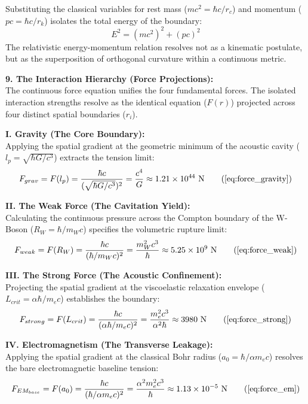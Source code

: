 Substituting the classical variables for rest mass ($mc^2 = \hbar c / r_c$) and momentum ($pc = \hbar c / r_k$) isolates the total energy of the boundary:
\begin{equation}
    E^2 = (mc^2)^2 + (pc)^2 
\end{equation}
The relativistic energy-momentum relation resolves not as a kinematic postulate, but as the superposition of orthogonal curvature within a continuous metric.

\vspace{0.2 cm}

\textbf{9. The Interaction Hierarchy (Force Projections):} \\
The continuous force equation unifies the four fundamental forces. The isolated interaction strengths resolve as the identical equation ($F(r)$) projected across four distinct spatial boundaries ($r_i$).

\textbf{I. Gravity (The Core Boundary):} \\
Applying the spatial gradient at the geometric minimum of the acoustic cavity ($l_p = \sqrt{\hbar G / c^3}$) extracts the tension limit:
\begin{equation}
    F_{grav} = F(l_p) = \frac{\hbar c}{(\sqrt{\hbar G / c^3})^2} = \frac{c^4}{G} \approx 1.21 \times 10^{44} \text{ N} \tag{\ref{eq:force_gravity}} 
\end{equation}

\textbf{II. The Weak Force (The Cavitation Yield):} \\
Calculating the continuous pressure across the Compton boundary of the W-Boson ($R_W = \hbar / m_W c$) specifies the volumetric rupture limit: 
\begin{equation}
    F_{weak} = F(R_W) = \frac{\hbar c}{(\hbar / m_W c)^2} = \frac{m_W^2 c^3}{\hbar} \approx 5.25 \times 10^9 \text{ N} \tag{\ref{eq:force_weak}} 
\end{equation}

\textbf{III. The Strong Force (The Acoustic Confinement):} \\
Projecting the spatial gradient at the viscoelastic relaxation envelope ($L_{crit} = \alpha \hbar / m_e c$) establishes the boundary: 
\begin{equation}
    F_{strong} = F(L_{crit}) = \frac{\hbar c}{(\alpha \hbar / m_e c)^2} = \frac{m_e^2 c^3}{\alpha^2 \hbar} \approx 3980 \text{ N} \tag{\ref{eq:force_strong}} 
\end{equation}

\textbf{IV. Electromagnetism (The Transverse Leakage):} \\
Applying the spatial gradient at the classical Bohr radius ($a_0 = \hbar / \alpha m_e c$) resolves the bare electromagnetic baseline tension:
\begin{equation}
    F_{EM_{base}} = F(a_0) = \frac{\hbar c}{(\hbar / \alpha m_e c)^2} = \frac{\alpha^2 m_e^2 c^3}{\hbar} \approx 1.13 \times 10^{-5} \text{ N} \tag{\ref{eq:force_em}}
\end{equation}

